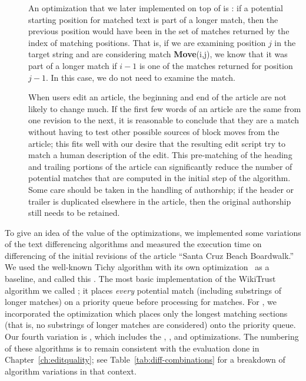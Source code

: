 \begin{description}
\item[]
    An optimization that we later implemented on top of
     is :
    if a potential starting position for matched text is part of
    a longer match, then the previous position would have
    been in the set of matches returned by the index of
    matching positions.
    That is, if we are examining position $j$ in the target string
    and are considering match \textbf{Move}(i,j), we know that it
    was part of a longer match if $i-1$ is one of the matches returned
    for position $j-1$.
    In this case, we do not need to examine the match.

\item[] When users edit an article, the beginning
    and end of the article are not likely to change much.
    If the first few words of an article are the same from one revision to
    the next, it is reasonable to conclude that they are a match
    without having to test other possible sources of block moves
    from the article; this fits well with our desire that the resulting
    edit script try to match a human description of the edit.
    This pre-matching of the heading and trailing portions of the
    article can significantly reduce the number of potential matches
    that are computed in the initial step of the algorithm.
    Some care should be taken in the handling of authorship;
    if the header or trailer is duplicated elsewhere in the article,
    then the original authorship still needs to be retained.

\end{description}


To give an idea of the value of the optimizations, we implemented some
variations of the text differencing algorithms and measured the
execution time on differencing of the initial revisions of the
article ``Santa Cruz Beach Boardwalk.''
We used the well-known Tichy algorithm with its own
optimization~\cite{Tichy1984,Obst1987,Reichenberger1991}
as a baseline, and called this .
The most basic implementation of the WikiTrust algorithm we called
; it places \textit{every} potential match (including substrings
of longer matches) on a priority queue
before processing for matches.
For , we incorporated the  optimization which
places only the longest matching sections (that is, no substrings of
longer matches are considered) onto the priority queue.
Our fourth variation is , which includes the ,
, and  optimizations.
The numbering of these algorithms is to remain consistent with the
evaluation done in Chapter~\ref{ch:editquality}; see
Table~\ref{tab:diff-combinations} for a breakdown of algorithm
variations in that context.


